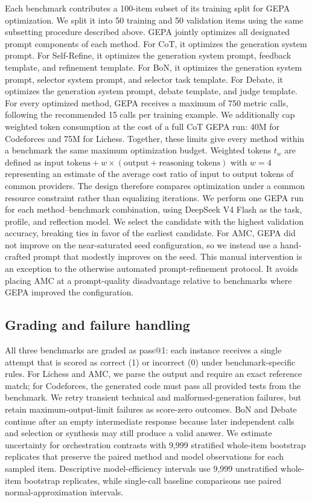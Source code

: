 \documentclass[a4paper]{article}
\theoremstyle{plain}
\theoremstyle{definition}
\theoremstyle{remark}
\begin{document}
Each benchmark contributes a 100-item subset of its training split for GEPA optimization.
We split it into 50 training and 50 validation items using the same subsetting procedure described above.
GEPA jointly optimizes all designated prompt components of each method.
For CoT, it optimizes the generation system prompt.
For Self-Refine, it optimizes the generation system prompt, feedback template, and refinement template.
For BoN, it optimizes the generation system prompt, selector system prompt, and selector task template.
For Debate, it optimizes the generation system prompt, debate template, and judge template.
For every optimized method, GEPA receives a maximum of 750 metric calls, following the recommended 15 calls per training example.
We additionally cap weighted token consumption at the cost of a full CoT GEPA run: 40M for Codeforces and 75M for Lichess.
Together, these limits give every method within a benchmark the same maximum optimization budget.
Weighted tokens $t_w$ are defined as $\text{input tokens} + w \times (\text{output} + \text{reasoning tokens})$ with $w=4$ representing an estimate of the average cost ratio of input to output tokens of common providers.
The design therefore compares optimization under a common resource constraint rather than equalizing iterations.
We perform one GEPA run for each method--benchmark combination, using DeepSeek V4 Flash as the task, profile, and reflection model.
We select the candidate with the highest validation accuracy, breaking ties in favor of the earliest candidate.
For AMC, GEPA did not improve on the near-saturated seed configuration, so we instead use a hand-crafted prompt that modestly improves on the seed.
This manual intervention is an exception to the otherwise automated prompt-refinement protocol.
It avoids placing AMC at a prompt-quality disadvantage relative to benchmarks where GEPA improved the configuration.

\subsection{Grading and failure handling}
All three benchmarks are graded as pass@1: each instance receives a single attempt that is scored as correct (1) or incorrect (0) under benchmark-specific rules.
For Lichess and AMC, we parse the output and require an exact reference match; for Codeforces, the generated code must pass all provided tests from the benchmark.
We retry transient technical and malformed-generation failures, but retain maximum-output-limit failures as score-zero outcomes.
BoN and Debate continue after an empty intermediate response because later independent calls and selection or synthesis may still produce a valid answer.
We estimate uncertainty for orchestration contrasts with 9,999 stratified whole-item bootstrap replicates that preserve the paired method and model observations for each sampled item.
Descriptive model-efficiency intervals use 9,999 unstratified whole-item bootstrap replicates, while single-call baseline comparisons use paired normal-approximation intervals.
\end{document}
